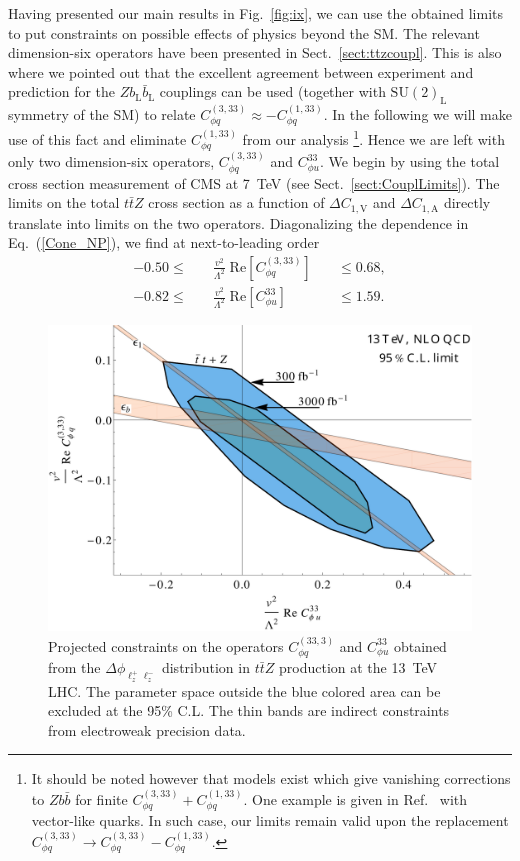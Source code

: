 \documentclass{JHEP3}
\def\ttbZ{t\bar{t}Z}
\def\DConeA{\Delta C_{1,\mathrm{A}}}
\def\DConeV{\Delta C_{1,\mathrm{V}}}
\newcommand{\be}{\begin{eqnarray}}
\newcommand{\ee}{\end{eqnarray}}
\begin{document}
Having presented our main results in Fig.~\ref{fig:ix}, we can use the obtained limits to put constraints on 
possible effects of physics beyond the SM. 
The relevant dimension-six operators have been presented in Sect.~\ref{sect:ttzcoupl}.
This is also where we pointed out that the excellent agreement between experiment and prediction
for the $Z b_\mathrm{L} \bar{b}_\mathrm{L}$ couplings can be used 
(together with $\mathrm{SU(2)_L}$ symmetry of the SM) to relate $C^{(3,33)}_{\phi q} \approx - C^{(1,33)}_{\phi q}$.
In the following we will make use of this fact and eliminate $C^{(1,33)}_{\phi q}$ from our analysis
\footnote{It should be noted however that models exist which give vanishing corrections to $Zb\bar{b}$ for finite $C^{(3,33)}_{\phi q} + C^{(1,33)}_{\phi q}$. 
One example is given in Ref.~\cite{delAguila:2000rc} with vector-like quarks. In such case, our limits remain valid upon the 
replacement $C^{(3,33)}_{\phi q} \to C^{(3,33)}_{\phi q} -C^{(1,33)}_{\phi q} $.}.
Hence we are left with only two dimension-six operators, $C^{(3,33)}_{\phi q}$ and $C^{33}_{\phi u}$.
We begin by using the total cross section measurement of CMS at 7~TeV (see Sect.~\ref{sect:CouplLimits}). 
The limits on the total $\ttbZ$ cross section as a function of $\DConeV$ and $\DConeA$ directly
translate into limits on the two operators. 
Diagonalizing the dependence in Eq.~(\ref{Cone_NP}), we find at next-to-leading order
\be
  -0.50
  \le & \quad \frac{v^2}{\Lambda^2} \;  \mathrm{Re} \left[ C^{(3,33)}_{\phi q} \right]  \quad 
  &\le 
  0.68,
  \nonumber \\
  -0.82
  \le & \quad \frac{v^2}{\Lambda^2} \;  \mathrm{Re} \left[ C^{33}_{\phi u} \right]  \quad 
  &\le
  1.59. 
\ee
% 
\begin{figure}[t]
\centering
\includegraphics[scale=0.43]{OPLimitNLO.pdf} 
\caption{\label{fig:x} Projected constraints on the operators $C^{(33,3)}_{\phi q}$ and $C^{33}_{\phi u}$
obtained from the $\Delta \phi_{\ell^+_z \ell^-_z}$ distribution in $\ttbZ$ production at the 13~TeV LHC. 
The parameter space outside the blue colored area can be excluded at the 95\% C.L.
The thin bands are indirect constraints from electroweak precision data.
}
\end{figure}
\end{document}
